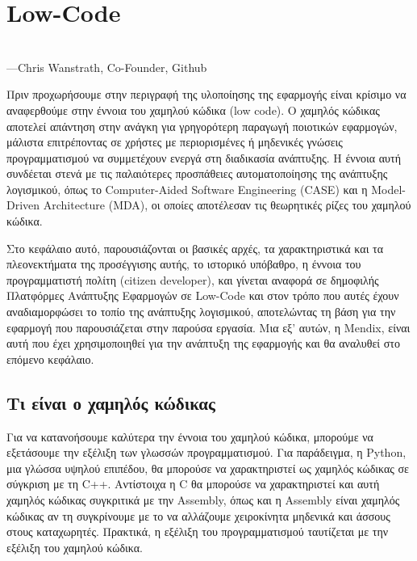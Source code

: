 \chapter{Low-Code}
    \begin{displayquote} \centering
         \\
        \hspace*{\fill}---Chris Wanstrath, Co-Founder, Github
    \end{displayquote}
    \vspace{1em}

    Πριν προχωρήσουμε στην περιγραφή της υλοποίησης της εφαρμογής είναι κρίσιμο να αναφερθούμε στην έννοια του χαμηλού κώδικα (low code). Ο χαμηλός κώδικας αποτελεί απάντηση στην ανάγκη για γρηγορότερη παραγωγή ποιοτικών εφαρμογών, μάλιστα επιτρέποντας σε χρήστες με περιορισμένες ή μηδενικές γνώσεις προγραμματισμού να συμμετέχουν ενεργά στη διαδικασία ανάπτυξης. Η έννοια αυτή συνδέεται στενά με τις παλαιότερες προσπάθειες αυτοματοποίησης της ανάπτυξης λογισμικού, όπως το Computer-Aided Software Engineering (CASE) και η Model-Driven Architecture (MDA), οι οποίες αποτέλεσαν τις θεωρητικές ρίζες του χαμηλού κώδικα.

    Στο κεφάλαιο αυτό, παρουσιάζονται οι βασικές αρχές, τα χαρακτηριστικά και τα πλεονεκτήματα της προσέγγισης αυτής, το ιστορικό υπόβαθρο, η έννοια του προγραμματιστή πολίτη (citizen developer), και γίνεται αναφορά σε δημοφιλής Πλατφόρμες Ανάπτυξης Εφαρμογών σε Low-Code και στον τρόπο που αυτές έχουν αναδιαμορφώσει το τοπίο της ανάπτυξης λογισμικού, αποτελώντας τη βάση για την εφαρμογή που παρουσιάζεται στην παρούσα εργασία. Μια εξ' αυτών, η Mendix, είναι αυτή που έχει χρησιμοποιηθεί για την ανάπτυξη της εφαρμογής και θα αναλυθεί στο επόμενο κεφάλαιο.


    \section{Τι είναι ο χαμηλός κώδικας}
        \begin{displayquote} \justifying
             \cite{Ibm_2024}
        \end{displayquote}

        Για να κατανοήσουμε καλύτερα την έννοια του χαμηλού κώδικα, μπορούμε να εξετάσουμε την εξέλιξη των γλωσσών προγραμματισμού. Για παράδειγμα, η Python, μια γλώσσα υψηλού επιπέδου, θα μπορούσε να χαρακτηριστεί ως χαμηλός κώδικας σε σύγκριση με τη C++. Αντίστοιχα η C θα μπορούσε να χαρακτηριστεί και αυτή χαμηλός κώδικας συγκριτικά με την Assembly, όπως και η Assembly είναι χαμηλός κώδικας αν τη συγκρίνουμε με το να αλλάζουμε χειροκίνητα μηδενικά και άσσους στους καταχωρητές. Πρακτικά, η εξέλιξη του προγραμματισμού ταυτίζεται με την εξέλιξη του χαμηλού κώδικα.

